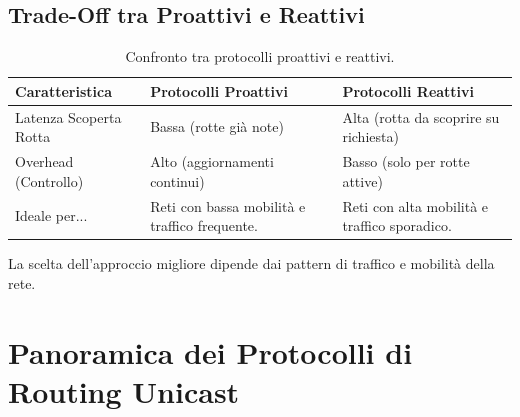 \subsection{Trade-Off tra Proattivi e Reattivi}
\begin{table}[H]
    \centering
    \begin{tabular}{|l|p{5cm}|p{5cm}|}
        \hline
        \textbf{Caratteristica} & \textbf{Protocolli Proattivi} & \textbf{Protocolli Reattivi} \\
        \hline
        Latenza Scoperta Rotta & Bassa (rotte già note) & Alta (rotta da scoprire su richiesta) \\
        \hline
        Overhead (Controllo) & Alto (aggiornamenti continui) & Basso (solo per rotte attive) \\
        \hline
        Ideale per... & Reti con bassa mobilità e traffico frequente. & Reti con alta mobilità e traffico sporadico. \\
        \hline
    \end{tabular}
    \caption{Confronto tra protocolli proattivi e reattivi.}
    \label{tab:pro_vs_rea}
\end{table}
La scelta dell'approccio migliore dipende dai pattern di traffico e mobilità della rete.

\section{Panoramica dei Protocolli di Routing Unicast}

